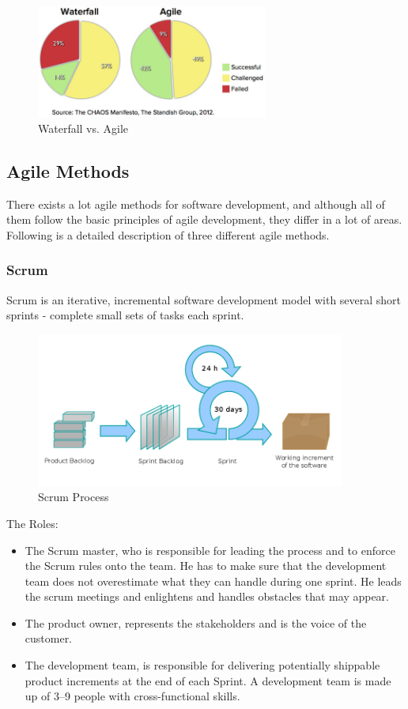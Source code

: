 \begin{figure}
\centering
\includegraphics[width=3in]{image/Agile-Waterfall.jpeg}
\caption{Waterfall vs. Agile}
\label{figure:devchart}
\end{figure}

\subsection{Agile Methods}
There exists a lot agile methods for software development, and although all of them follow the basic principles of agile development, they differ in a lot of areas. Following is a detailed description of three different agile methods.

\subsubsection{Scrum}
Scrum is an iterative, incremental software development model with several short sprints - complete small sets of tasks each sprint.

\begin{figure}
\centering
\includegraphics[width=4in]{image/Scrum_process.png}
\caption{Scrum Process}
\label{figure:scrumprocess}
\end{figure}


The Roles: 
\begin{itemize}

\item The Scrum master, who is responsible for leading the process and to enforce the Scrum rules onto the team. He has to make sure that the development team does not overestimate what they can handle during one sprint. He leads the scrum meetings and enlightens and handles obstacles that may appear. 

\item The product owner, represents the stakeholders and is the voice of the customer.

\item The development team, is responsible for delivering potentially shippable product increments at the end of each Sprint. A development team is made up of 3–9 people with cross-functional skills.

\end{itemize}

